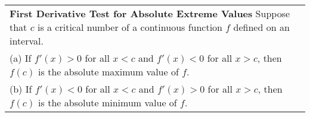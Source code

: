 \documentclass{article}
\begin{document}
\begin{center}
{\begin{tabularx}{.9\textwidth}{|X|}
\hline
\end{tabularx}}
\vspace{24pt}

\large
\def\arraystretch{1.3}
{\setlength{\tabcolsep}{16pt}
\begin{tabularx}{.9\textwidth}{|X|}
\hline
	\vspace{1pt}
	\textbf{First Derivative Test for Absolute Extreme Values} \: Suppose that $c$ is a critical number of a continuous function $f$ defined on an interval. \\
	(a) \: If $f'(x)  > 0$ for all $x<c$ and $f'(x) < 0$ for all $x>c$, then $f(c)$ is the absolute maximum value of $f$. \\
	(b) \: If $f'(x) < 0$ for all $x<c$ and $f'(x) > 0$ for all $x>c$, then $f(c)$ is the absolute minimum value of $f$. \\[12pt]	
\hline
\end{tabularx}}
\end{center}
\pagebreak
\end{document}
